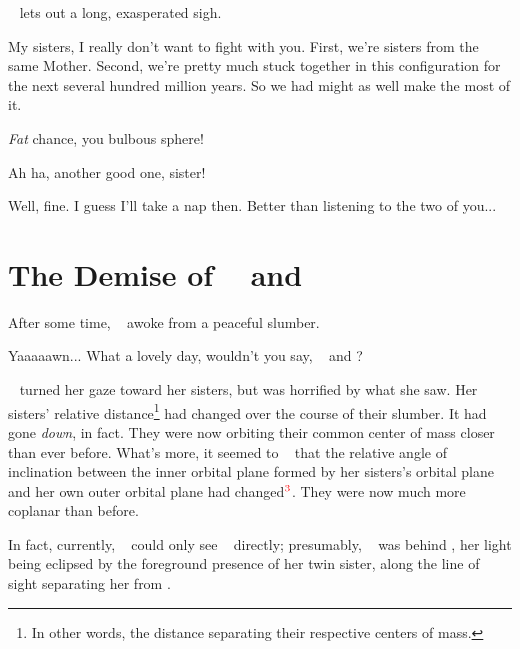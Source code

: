 \documentclass[main.tex]{subfiles}
\begin{document}
\par \nar \rmcelaeno~ lets out a long, exasperated sigh.

\par \Celaeno My sisters, I really don't want to fight with you.  First, we're sisters from the same Mother.  Second, we're pretty much stuck together in this configuration for the next several hundred million years.  So we had might as well make the most of it.

\par \Taygete \textit{Fat} chance, you bulbous sphere!

\par \Alcyone Ah ha, another good one, sister!

\par \Celaeno Well, fine.  I guess I'll take a nap then.  Better than listening to the two of you...

\section{The Demise of \rmtaygete~ and \rmalcyone}

\par \nar After some time, \rmcelaeno~ awoke from a peaceful slumber.  

\par \Celaeno Yaaaaawn... What a lovely day, wouldn't you say, \rmtaygete~ and \rmalcyone?

\par \nar \rmcelaeno~ turned her gaze toward her sisters, but was horrified by what she saw.  Her sisters' relative distance\footnote{In other words, the distance separating their respective centers of mass.} had changed over the course of their slumber.  It had gone \textit{down}, in fact.  They were now orbiting their common center of mass closer than ever before.  What's more, it seemed to \rmcelaeno~ that the relative angle of inclination between the inner orbital plane formed by her sisters's orbital plane and her own outer orbital plane had changed$^{\textcolor{red}{3}}$.  They were now much more coplanar than before.


\par \nar  In fact, currently, \rmcelaeno~ could only see \rmalcyone~ directly; presumably, \rmtaygete~ was behind \rmalcyone, her light being eclipsed by the foreground presence of her twin sister, along the line of sight separating her from \rmcelaeno.
\end{document}
